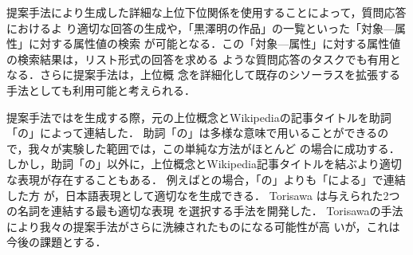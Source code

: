 \documentclass[japanese]{jnlp_1.4}
\newcommand{\thype}{}
\newcommand{\xmp}[1]{}
\begin{document}
提案手法により生成した詳細な上位下位関係を使用することによって，質問応答におけるよ
り適切な回答の生成や，「黒澤明の作品」の一覧といった「対象—属性」に対する属性値の検索
が可能となる．この「対象—属性」に対する属性値の検索結果は，リスト形式の回答を求める
ような質問応答のタスク\cite{Dang2006,Dang2007}でも有用となる．さらに提案手法は，上位概
念を詳細化して既存のシソーラスを拡張する手法としても利用可能と考えられる．

提案手法では\thype{}を生成する際，元の上位概念とWikipediaの記事タイトルを助詞「の」によって連結した．
助詞「の」は多様な意味で用いることができるので，我々が実験した範囲では，この単純な方法がほとんど
の場合に成功する．
しかし，助詞「の」以外に，上位概念とWikipedia記事タイトルを結ぶより適切
な表現が存在することもある．
例えば\xmp{作品}と\xmp{黒澤明}の場合，「の」よりも「による」で連結した方
が，日本語表現として適切な\thype{}を生成できる．
Torisawa \cite{torisawa01}は与えられた2つの名詞を連結する最も適切な表現
を選択する手法を開発した．
Torisawaの手法により我々の提案手法がさらに洗練されたものになる可能性が高
いが，これは今後の課題とする．
\end{document}
